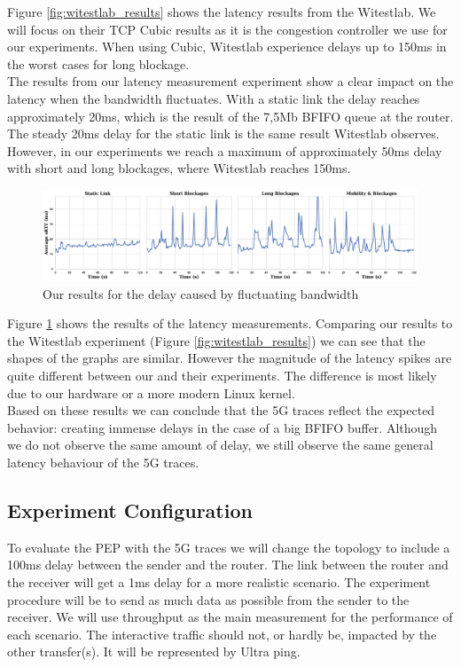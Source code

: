 \documentclass[a4paper,english, 11pt]{report}
\begin{document}
Figure \ref{fig:witestlab_results} shows the latency results from the Witestlab. We will focus on their TCP Cubic results as it is the congestion controller we use for our experiments. When using Cubic, Witestlab experience delays up to 150ms in the worst cases for long blockage.\\

The results from our latency measurement experiment show a clear impact on the latency when the bandwidth fluctuates. With a static link the delay reaches approximately 20ms, which is the result of the 7,5Mb BFIFO queue at the router. The steady 20ms delay for the static link is the same result Witestlab observes. However, in our experiments we reach a maximum of approximately 50ms delay with short and long blockages, where Witestlab reaches 150ms.\\

\begin{figure}[h!] %
	\centering
	\includegraphics[scale=0.25]{../diagrams/witestlab/combined_plots.pdf}
  	\caption{Our results for the delay caused by fluctuating bandwidth}
  	\label{fig:witestlab_graph_delay_1}
\end{figure}

Figure \ref{fig:witestlab_graph_delay_1} shows the results of the latency measurements. Comparing our results to the Witestlab experiment (Figure \ref{fig:witestlab_results}) we can see that the shapes of the graphs are similar. However the magnitude of the latency spikes are quite different between our and their experiments. The difference is most likely due to our hardware or a more modern Linux kernel.\\

Based on these results we can conclude that the 5G traces reflect the expected behavior: creating immense delays in the case of a big BFIFO buffer. Although we do not observe the same amount of delay, we still observe the same general latency behaviour of the 5G traces.

\subsection{Experiment Configuration}
To evaluate the PEP with the 5G traces we will change the topology to include a 100ms delay between the sender and the router. The link between the router and the receiver will get a 1ms delay for a more realistic scenario. The experiment procedure will be to send as much data as possible from the sender to the receiver. We will use throughput as the main measurement for the performance of each scenario. The interactive traffic should not, or hardly be, impacted by the other transfer(s). It will be represented by Ultra ping.
\end{document}
